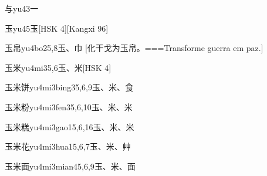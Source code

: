\begin{EntryWithPhonetic}{与}{yu4}{3}{⼀}
\end{EntryWithPhonetic}

\begin{EntryWithPhonetic}{玉}{yu4}{5}{⽟}[HSK 4][Kangxi 96]
\end{EntryWithPhonetic}

\begin{EntryWithPhonetic}{玉帛}{yu4bo2}{5,8}{⽟、⼱}
  [化干戈为玉帛。===Transforme guerra em paz.]
\end{EntryWithPhonetic}

\begin{EntryWithPhonetic}{玉米}{yu4mi3}{5,6}{⽟、⽶}[HSK 4]
\end{EntryWithPhonetic}

\begin{EntryWithPhonetic}{玉米饼}{yu4mi3bing3}{5,6,9}{⽟、⽶、⾷}
\end{EntryWithPhonetic}

\begin{EntryWithPhonetic}{玉米粉}{yu4mi3fen3}{5,6,10}{⽟、⽶、⽶}
\end{EntryWithPhonetic}

\begin{EntryWithPhonetic}{玉米糕}{yu4mi3gao1}{5,6,16}{⽟、⽶、⽶}
\end{EntryWithPhonetic}

\begin{EntryWithPhonetic}{玉米花}{yu4mi3hua1}{5,6,7}{⽟、⽶、⾋}
\end{EntryWithPhonetic}

\begin{EntryWithPhonetic}{玉米面}{yu4mi3mian4}{5,6,9}{⽟、⽶、⾯}
\end{EntryWithPhonetic}

